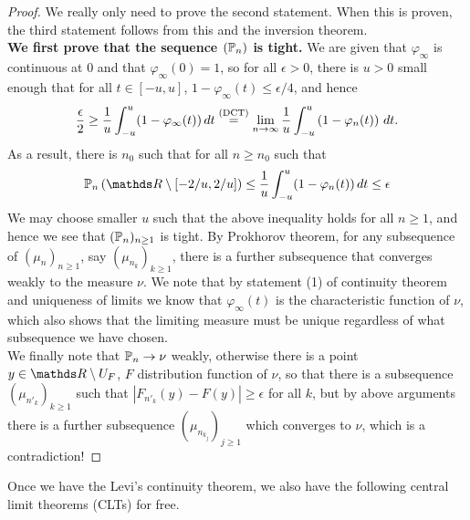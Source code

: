 \begin{unexaminable}
\begin{proof}
We really only need to prove the second statement. When this is proven, the third statement follows from this and the inversion theorem. \\ 

\textbf{We first prove that the sequence $(\mathbb{P}_n)$ is tight.} We are given that $\varphi_\infty$ is continuous at 0 and that $\varphi_\infty(0) = 1$, so for all $\epsilon > 0$, there is $u > 0$ small enough that for all $t \in [-u,u]$, $1 - \varphi_\infty(t) \leq \epsilon / 4$, and hence 
\begin{equation}
\frac{\epsilon}{2} \geq \frac{1}{u} \int_{-u}^u (1-\varphi_\infty(t)) \, dt \overset{\text{(DCT)}}{=} \lim_{n\to\infty} \frac{1}{u} \int_{-u}^u \left( 1-\varphi_n(t) \right) \, dt.
\end{equation}
As a result, there is $n_0$ such that for all $n \geq n_0$ such that 
\begin{equation}
\p_n\bracket{\R\setminus [-2/u,2/u]} \leq \frac{1}{u} \int_{-u}^u (1-\varphi_n(t)) \, dt \leq \epsilon
\end{equation}
We may choose smaller $u$ such that the above inequality holds for all $n \geq 1$, and hence we see that $(\mathbb{P}_n)_{n\geq 1}$ is tight. By Prokhorov theorem, for any subsequence of $(\mu_n)_{n\geq 1}$, say $(\mu_{n_k})_{k\geq 1}$, there is a further subsequence that converges weakly to the measure $\nu$. We note that by statement (1) of continuity theorem and uniqueness of limits we know that $\varphi_\infty(t)$ is the characteristic function of $\nu$, which also shows that the limiting measure must be unique regardless of what subsequence we have chosen. \\

We finally note that $\mathbb{P}_n \to \nu$ weakly, otherwise there is a point $y \in \R\setminus U_F$, $F$ distribution function of $\nu$, so that there is a subsequence $(\mu_{n'_k})_{k\geq 1}$ such that $|F_{n'_k}(y) - F(y)| \geq \epsilon$ for all $k$, but by above arguments there is a further subsequence $(\mu_{n_{k_j}})_{j\geq 1}$ which converges to $\nu$, which is a contradiction!
\end{proof}
\end{unexaminable}

Once we have the Levi's continuity theorem, we also have the following central limit theorems (CLTs) for free.

